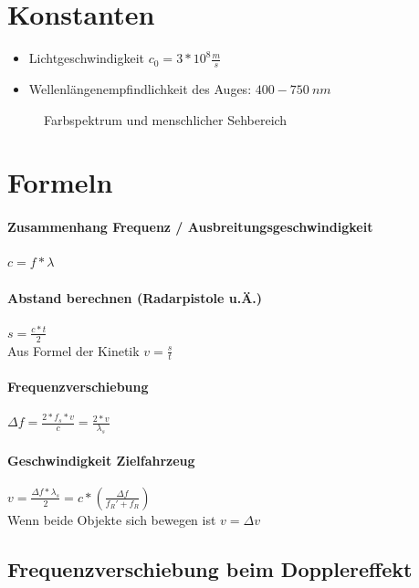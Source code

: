 \documentclass[12pt, a4paper]{scrreprt}
\begin{document}
\section{Konstanten}

\begin{itemize}
\item Lichtgeschwindigkeit \(c_0 = 3*10^8\frac{m}{s}\)
\item Wellenlängenempfindlichkeit des Auges: \(400 - 750\ nm\)
\end{itemize}

\begin{figure}[H]
  \centering
  
  \caption[Farbspektrum]{Farbspektrum und menschlicher Sehbereich}
  \label{fig:Spektrum}
\end{figure}

\section{Formeln}
\paragraph{Zusammenhang Frequenz / Ausbreitungsgeschwindigkeit} \dotfill \(c = f * \lambda\)
\paragraph{Abstand berechnen (Radarpistole u.Ä.)} \dotfill \(s = \frac{c * t}{2}\)\\
\myhspace \textcolor{myred}{Aus Formel der Kinetik \(v = \frac{s}{t}\)}
\paragraph{Frequenzverschiebung} \dotfill \(\Delta f = \frac{2 * f_s * v}{c} = \frac{2 * v}{\lambda_s}\)
\paragraph{Geschwindigkeit Zielfahrzeug} \dotfill \(v = \frac{\Delta f * \lambda_s}{2} = c * \left( \frac{\Delta f}{f_R'+f_R} \right) \)\\
\myhspace\textcolor{myred}{Wenn beide Objekte sich bewegen ist \(v = \Delta v\)}

\subsection*{Frequenzverschiebung beim Dopplereffekt}
\end{document}
